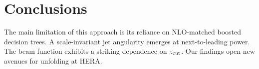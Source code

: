 \section{Conclusions}\label{sec:conclusions}

The main limitation of this approach is its reliance on NLO-matched
boosted decision trees. A scale-invariant jet angularity emerges at
next-to-leading power. The beam function exhibits a striking dependence
on $z_{\rm cut}$. Our findings open new avenues for unfolding at HERA.

